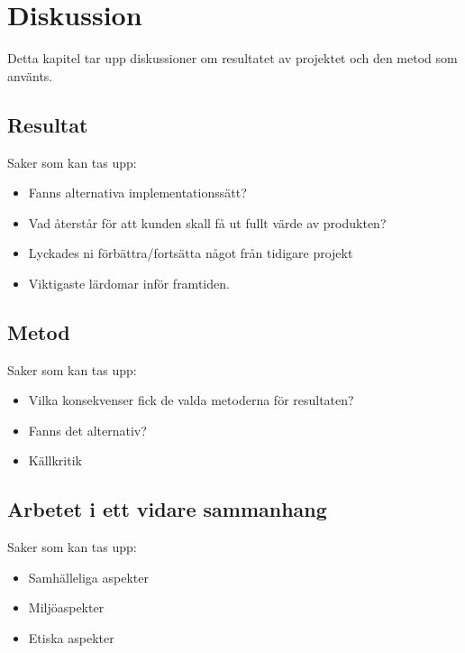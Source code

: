 \chapter{Diskussion}
Detta kapitel tar upp diskussioner om resultatet av projektet och den metod som använts.
\section{Resultat}
Saker som kan tas upp:
\begin{itemize}
\item Fanns alternativa implementationssätt?
\item Vad återstår för att kunden skall få ut fullt värde av produkten?
\item Lyckades ni förbättra/fortsätta något från tidigare projekt
\item Viktigaste lärdomar inför framtiden.
\end{itemize}

\section{Metod}
Saker som kan tas upp:
\begin{itemize}
\item Vilka konsekvenser fick de valda metoderna för resultaten?
\item Fanns det alternativ?
\item Källkritik
\end{itemize}

\section{Arbetet i ett vidare sammanhang}
Saker som kan tas upp:
\begin{itemize}
\item Samhälleliga aspekter
\item Miljöaspekter
\item Etiska aspekter
\end{itemize}